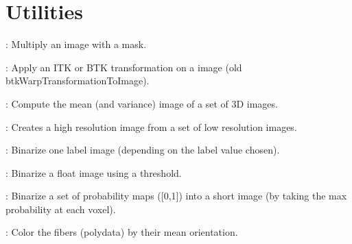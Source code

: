 \newpage
\section{Utilities}
\label{sec:utilities}

\begin{description}

\item[btkApplyMaskToImage]: Multiply an image with a mask.
\item[btkApplyTransformationToImage]: Apply an ITK or BTK transformation on a image (old btkWarpTransformationToImage).
\item[btkAverage3DImages]: Compute the mean (and variance) image of a set of 3D images.
\item[btkAverageImagesWithReference]: Creates a high resolution image from a set of low resolution images.
\item[btkBinarizeLabels]: Binarize one label image (depending on the label value chosen).
\item[btkBinarizeMask]: Binarize a float image using a threshold.
\item[btkBinarizeTissueProbabilityMaps]: Binarize a set of probability maps ([0,1]) into a short image (by taking the max probability at each voxel).
\item[btkColorFiberTractsByMeanOrientation]: Color the fibers (polydata) by their mean orientation.

\end{description}
